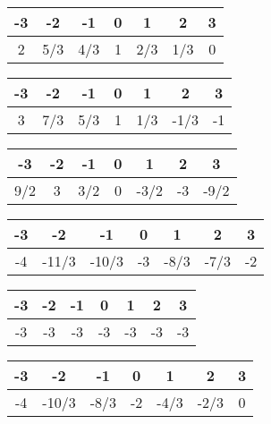 \documentclass[12pt]{article}
\theoremstyle{note}
\begin{document}
\begin{flushleft}
 \vspace{0.5cm}\begin{tabular}{c|c|c|c|c|c|c}
-3&-2&-1&0&1&2&3\\ \hline 
2&5/3&4/3&1&2/3&1/3&0\end{tabular} 

 \vspace{0.5cm}\begin{tabular}{c|c|c|c|c|c|c}
-3&-2&-1&0&1&2&3\\ \hline 
3&7/3&5/3&1&1/3&-1/3&-1\end{tabular} 

 \vspace{0.5cm}\begin{tabular}{c|c|c|c|c|c|c}
-3&-2&-1&0&1&2&3\\ \hline 
9/2&3&3/2&0&-3/2&-3&-9/2\end{tabular} 

 \vspace{0.5cm}\begin{tabular}{c|c|c|c|c|c|c}
-3&-2&-1&0&1&2&3\\ \hline 
-4&-11/3&-10/3&-3&-8/3&-7/3&-2\end{tabular} 

 \vspace{0.5cm}\begin{tabular}{c|c|c|c|c|c|c}
-3&-2&-1&0&1&2&3\\ \hline 
-3&-3&-3&-3&-3&-3&-3\end{tabular} 

 \vspace{0.5cm}\begin{tabular}{c|c|c|c|c|c|c}
-3&-2&-1&0&1&2&3\\ \hline 
-4&-10/3&-8/3&-2&-4/3&-2/3&0\end{tabular} 

 \vspace{0.5cm}\end{flushleft}
\end{document}
